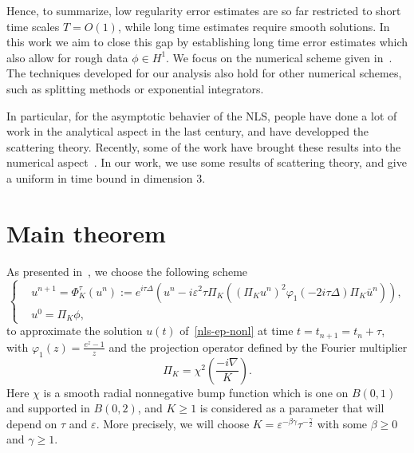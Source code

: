 \documentclass[10pt,a4paper]{article}
\begin{document}
  Hence, to summarize, low regularity error estimates
  are so far restricted to short time scales \(T=O(1)\), while long time estimates
  require smooth solutions.
  In this work we aim to close this gap by establishing long time error estimates 
  which also allow for rough data \(\phi \in H^1\). We focus on the numerical scheme 
  given in~\cite{ORS21}. The techniques developed for our analysis also hold for 
  other numerical schemes, such as splitting methods or exponential integrators.



  In particular, for the asymptotic behavier of the NLS, people have
  done a lot of work in the analytical aspect in the last century, and
  have developped the scattering theory. Recently,
  some of the work have brought these results into the numerical aspect~\cite{CS22}. In our
  work, we use some results of scattering theory, and give a uniform in time
  bound in dimension \(3\).

  \section{Main theorem}

  As presented in~\cite{ORS21}, we choose the following scheme
  \begin{equation}\label{num-sol} %
    \left\{
    \begin{aligned}
      & u^{n+1} = \Phi_K^{\tau}(u^n) := e^{i\tau\Delta} \left( u^n -
      i\varepsilon^2 \tau \Pi_K
      \left( {(\Pi_K u^n)}^2 \varphi_1(-2i\tau\Delta)\Pi_K \bar{u}^n \right) \right), \\
      & u^0 = \Pi_K \phi,
    \end{aligned}
    \right.
  \end{equation}
  to approximate the solution \(u(t)\) of~\eqref{nls-ep-nonl} at time \( t = t_{n+1} = t_n + \tau \),
  with \( \varphi_1(z) = \frac{e^z-1}{z} \) and the projection operator defined
  by the Fourier multiplier
  \begin{equation}
    \Pi_K = \chi^2 \left( \frac{-i\nabla}{K} \right).
  \end{equation}
  Here \(\chi\) is a smooth radial nonnegative bump function which is one on \(
  B(0,1) \) and supported in \( B(0,2) \), and \( K \geq 1 \) is considered as a
  parameter that will depend on \(\tau\) and \(\varepsilon\). More precisely, we will choose \( K =
  \varepsilon^{-\beta\gamma}\tau^{-\frac\gamma2} \) with some \(\beta \geq 0\) and 
  \(\gamma \geq 1\).  %
\end{document}
